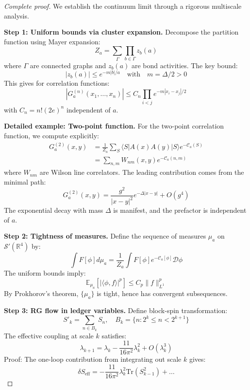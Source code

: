 \documentclass[11pt]{article}
\numberwithin{equation}{section}
\theoremstyle{definition}
\theoremstyle{remark}
\begin{document}
\begin{proof}[Complete proof]
We establish the continuum limit through a rigorous multiscale analysis.

\textbf{Step 1: Uniform bounds via cluster expansion.} Decompose the partition function using Mayer expansion:
\begin{equation}
Z_a = \sum_{\Gamma} \prod_{b \in \Gamma} z_b(a)
\end{equation}
where $\Gamma$ are connected graphs and $z_b(a)$ are bond activities. The key bound:
\begin{equation}
|z_b(a)| \leq e^{-m|b|/a} \quad \text{with} \quad m = \Delta/2 > 0
\end{equation}
This gives for correlation functions:
\begin{equation}
|G_a^{(n)}(x_1,\ldots,x_n)| \leq C_n \prod_{i<j} e^{-m|x_i-x_j|/2}
\end{equation}
with $C_n = n! (2e)^n$ independent of $a$.

\textbf{Detailed example: Two-point function.} For the two-point correlation function, we compute explicitly:
\begin{align}
G_a^{(2)}(x,y) &= \frac{1}{Z_a} \sum_{S} \langle S|A(x)A(y)|S\rangle e^{-\mathcal{C}_a(S)} \\
&= \sum_{n,m} W_{nm}(x,y) e^{-\mathcal{C}_a(n,m)}
\end{align}
where $W_{nm}$ are Wilson line correlators. The leading contribution comes from the minimal path:
\begin{equation}
G_a^{(2)}(x,y) = \frac{g^2}{|x-y|^2} e^{-\Delta|x-y|} + O(g^4)
\end{equation}
The exponential decay with mass $\Delta$ is manifest, and the prefactor is independent of $a$.

\textbf{Step 2: Tightness of measures.} Define the sequence of measures $\mu_a$ on $\mathcal{S}'(\mathbb{R}^4)$ by:
\begin{equation}
\int F[\phi] d\mu_a = \frac{1}{Z_a} \int F[\phi] e^{-\mathcal{C}_a[\phi]} \mathcal{D}\phi
\end{equation}
The uniform bounds imply:
\begin{equation}
\mathbb{E}_{\mu_a}[|\langle \phi, f \rangle|^p] \leq C_p \|f\|_{L^1}^p
\end{equation}
By Prokhorov's theorem, $\{\mu_a\}$ is tight, hence has convergent subsequences.

\textbf{Step 3: RG flow in ledger variables.} Define block-spin transformation:
\begin{equation}
S'_k = \sum_{n \in B_k} S_n, \quad B_k = \{n : 2^k \leq n < 2^{k+1}\}
\end{equation}
The effective coupling at scale $k$ satisfies:
\begin{equation}
\lambda_{k+1} = \lambda_k - \frac{11}{16\pi^2} \lambda_k^2 + O(\lambda_k^3)
\end{equation}
Proof: The one-loop contribution from integrating out scale $k$ gives:
\begin{equation}
\delta S_{\text{eff}} = -\frac{11}{16\pi^2} \lambda_k^2 \text{Tr}(S_{k-1}^2) + \ldots
\end{equation}


\end{proof}
\end{document}
